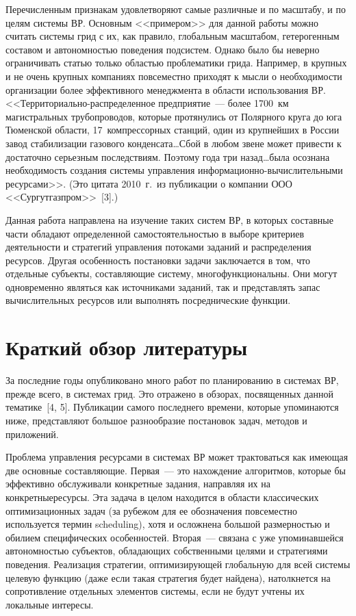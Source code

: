 \begin{multicols}{2}
  Перечисленным признакам удовлетворяют самые различные и по масштабу, и по целям 
системы ВР. Основным <<примером>> для данной работы можно считать системы грид с их, 
как правило, глобальным масштабом, гетерогенным составом и автономностью поведения 
подсистем. Однако было бы неверно ограничивать статью только об\-ластью проблематики 
грида. Например, в крупных и не очень крупных компаниях повсеместно приходят к мысли о 
необходимости организации более эффективного менеджмента в области использования ВР. 
<<Территориально-распределенное предприятие~--- более 1700~км магистральных 
трубопроводов, которые протянулись от Полярного круга до юга Тюменской области, 
17~компрессорных станций, один из крупнейших в России завод стабилизации газового 
конденсата\ldots Сбой в любом звене может привести к достаточно серьезным последствиям. 
Поэтому года три назад\ldots была осознана необходимость создания системы управления 
ин\-фор\-ма\-ци\-он\-но-вы\-чис\-ли\-тель\-ны\-ми ресурсами>>. (Это цитата 2010~г.\ из 
публикации о компании ООО <<Сургутгазпром>>~[3].)
  
  Данная работа направлена на изучение таких систем ВР, в которых составные части 
обладают определенной самостоятельностью в выборе критериев деятельности и стратегий 
управления потоками заданий и распределения ресурсов. Другая особенность постановки 
задачи заключается в том, что отдельные субъекты, составляющие систему, 
многофункциональны. Они могут одновременно являться как источниками заданий, так и 
пред\-став\-лять запас вычислительных ресурсов или выполнять посреднические функции.

\section{Краткий обзор литературы}
  
  За последние годы опубликовано много работ по планированию в системах ВР, прежде 
всего, в сис\-те\-мах грид. Это отражено в обзорах, посвященных данной тематике~[4, 5]. 
Публикации самого последнего времени, которые упоминаются ниже, представляют 
большое разнообразие постановок задач, методов и приложений.
  
  Проблема управления ресурсами в системах ВР может трактоваться как имеющая две 
основные со\-став\-ляющие. Первая~--- это нахождение алгоритмов, которые бы эффективно 
обслуживали конкретные задания, направляя их на конкретные\linebreak ресурсы. Эта задача в целом 
находится в об\-ласти классических оптимизационных задач (за рубежом для ее обозначения 
повсеместно используется термин scheduling), хотя и осложнена большой размерностью и 
обилием специфических особен\-ностей. Вторая~--- связана с уже упоминавшейся 
авто\-номностью субъектов, обладающих собственными  %
целями и стратегиями поведения. 
Реализация стратегии, оптимизирующей глобальную для всей системы целевую функцию 
(даже если такая стратегия будет найдена), натолкнется на со\-про\-тив\-ле\-ние отдельных 
элементов системы, если не будут учтены их локальные интересы.
  

\end{multicols}
